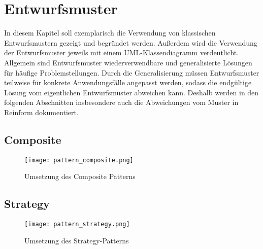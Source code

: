 \chapter{Entwurfsmuster}
\label{ch:Entwurfsmuster}

In diesem Kapitel soll exemplarisch die Verwendung von klassischen Entwurfsmustern gezeigt und begründet werden.
Außerdem wird die Verwendung der Entwurfsmuster jeweils mit einem UML-Klassendiagramm verdeutlicht.
\newline
Allgemein sind Entwurfsmuster wiederverwendbare und generalisierte Lösungen für häufige Problemstellungen.
Durch die Generalisierung müssen Entwurfsmuster teilweise für konkrete Anwendungsfälle angepasst werden, sodass die endgültige Lösung vom eigentlichen Entwurfsmuster abweichen kann.
Deshalb werden in den folgenden Abschnitten insbesondere auch die Abweichungen vom Muster in Reinform dokumentiert. 

\section{Composite}

\begin{figure}[h]
    \texttt{[image: pattern\_composite.png]}
    \centering
    \caption{Umsetzung des Composite Patterns}
    \label{fig:pattern_composite}
\end{figure}

\newpage
\section{Strategy}

\begin{figure}[h]
    \texttt{[image: pattern\_strategy.png]}
    \centering
    \caption{Umsetzung des Strategy-Patterns}
    \label{fig:pattern_strategy}
\end{figure}

